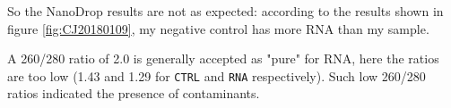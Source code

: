 So the NanoDrop results are not as expected: according to the results shown in figure \ref{fig:CJ20180109}, my negative control has more RNA than my sample.

A 260/280 ratio of 2.0 is generally accepted as "pure" for RNA, here the ratios are too low (1.43 and 1.29 for \texttt{CTRL} and \texttt{RNA} respectively). Such low 260/280 ratios indicated the presence of contaminants.